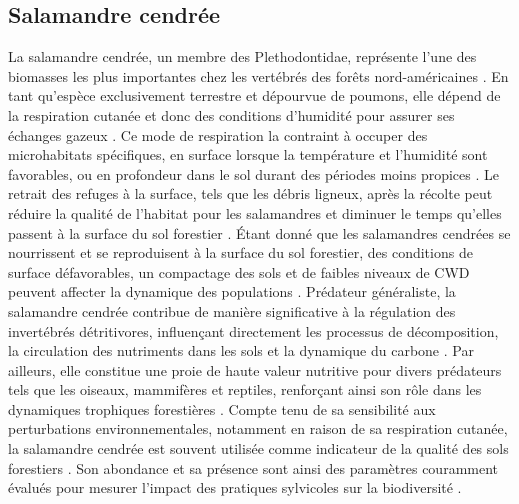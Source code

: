 \subsection*{Salamandre cendrée}

La salamandre cendrée, un membre des Plethodontidae, représente l'une des biomasses les plus importantes chez les vertébrés des forêts nord-américaines \citep{Burton1975Salamanderpopulations,Petranka1993Effectstimber,semlitschAbundanceBiomassProduction2014a}. 
En tant qu'espèce exclusivement terrestre et dépourvue de poumons, elle dépend de la respiration cutanée et donc des conditions d'humidité pour assurer ses échanges gazeux \citep{Heatwole1961Relationsubstrate}. 
Ce mode de respiration la contraint à occuper des microhabitats spécifiques, en surface lorsque la température et l'humidité sont favorables, ou en profondeur dans le sol durant des périodes moins propices \citep{Grizzell1949HibernationSite,FraserEmpiricalEvaluation1976,Jaeger1980MicrohabitatsTerrestrial}. 
Le retrait des refuges à la surface, tels que les débris ligneux, après la récolte peut réduire la qualité de l'habitat pour les salamandres et diminuer le temps qu'elles passent à la surface du sol forestier \citep{Achat2015Quantifyingconsequences,Peele2017EffectsWoody}. 
Étant donné que les salamandres cendrées se nourrissent et se reproduisent à la surface du sol forestier, des conditions de surface défavorables, un compactage des sols et de faibles niveaux de CWD peuvent affecter la dynamique des populations \citep{Peterman2014Spatialvariation}. 
Prédateur généraliste, la salamandre cendrée contribue de manière significative à la régulation des invertébrés détritivores, influençant directement les processus de décomposition, la circulation des nutriments dans les sols et la dynamique du carbone \citep{Burton1975Energyflow,Wyman1998Experimentalassessment,Walton2013Topdownregulation,Hickerson2017Easternredbacked}. 
Par ailleurs, elle constitue une proie de haute valeur nutritive pour divers prédateurs tels que les oiseaux, mammifères et reptiles, renforçant ainsi son rôle dans les dynamiques trophiques forestières \citep{Burton1975Energyflow,Pough1987abundancesalamanders}. 
Compte tenu de sa sensibilité aux perturbations environnementales, notamment en raison de sa respiration cutanée, la salamandre cendrée est souvent utilisée comme indicateur de la qualité des sols forestiers \citep{Welsh2001caseusing}. 
Son abondance et sa présence sont ainsi des paramètres couramment évalués pour mesurer l'impact des pratiques sylvicoles sur la biodiversité \citep{Harpole1999Effectsseven,Grialou2000effectsforest,Homyack2009Longtermeffects,Hocking2013Effectsexperimental,Mazerolle2021Woodlandsalamander}. 

